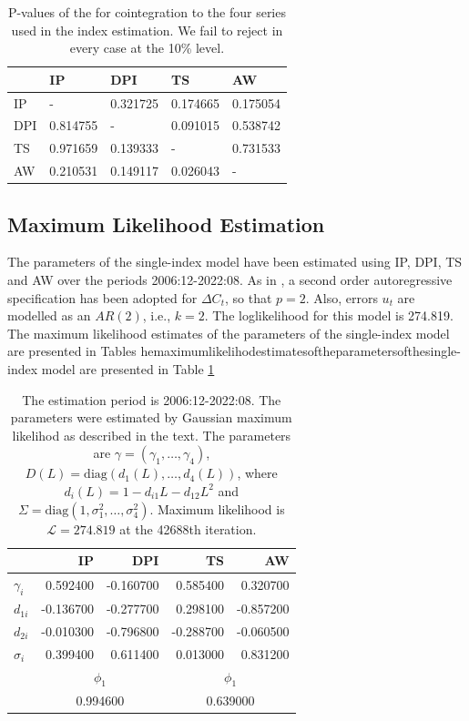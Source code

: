 	\begin{table}[h!]
		\centering\small
		\captionsetup{width=0.6\textwidth, font=small}
		\caption{P-values of the \protect\cite{engle1987co} for cointegration to the four series used in the index estimation. We fail to reject in every case at the 10\% level.}
		\begin{tabular}{l|llll}
		& IP & DPI & TS & AW \\\hline\hline
		IP & - & 0.321725 & 0.174665 & 0.175054 \\
		DPI & 0.814755 & - & 0.091015 & 0.538742 \\
		TS & 0.971659 & 0.139333 & - & 0.731533 \\
		AW & 0.210531 & 0.149117 & 0.026043 & - \\\hline
	\end{tabular}
	\end{table}

\subsection{Maximum Likelihood Estimation}

The parameters of the single-index model have been estimated using IP, DPI, TS and AW over the periods 2006:12-2022:08. As in , a second order autoregressive  specification  has been adopted for $\Delta C_t$, so that $p=2$. Also, errors $u_t$ are modelled as an $AR(2)$, i.e., $k=2$. The loglikelihood for this model is 274.819. The maximum likelihood estimates of the parameters of the single-index model are presented in Tables  hemaximumlikelihodestimatesoftheparametersofthesingle-index model are presented in Table \ref{tab:ml-params1}

	\begin{table}[h!]
		\centering\small
			\captionsetup{width=0.6\textwidth, font=small}
			\caption{The estimation period is 2006:12-2022:08. The parameters were estimated by Gaussian maximum likelihod as described in the text. The parameters are $\gamma = (\gamma_1,\ldots, \gamma_4)$, $D(L)=\text{diag}\left(d_1(L),\ldots, d_4(L)\right)$, where $d_i(L) = 1-d_{i1}L - d_{12}L^2$ and $\Sigma = \text{diag}\left(1,\sigma_1^2,\ldots,\sigma_4^2\right)$. Maximum likelihood is $\mathcal{L}=274.819$ at the 42688th iteration.}\label{tab:ml-params1}
		\begin{tabular}{l|rrrr}
			& IP & DPI & TS & AW \\\hline\hline
			$\gamma_i$ & 0.592400 & -0.160700 & 0.585400 & 0.320700 \\
			$d_{1i}$ & -0.136700 & -0.277700 & 0.298100 & -0.857200 \\
			$d_{2i}$ & -0.010300 & -0.796800 & -0.288700 & -0.060500 \\
			$\sigma_{i}$ & 0.399400 & 0.611400 & 0.013000 & 0.831200 \\\hline\hline
			&\multicolumn{2}{c}{$\phi_1$} & \multicolumn{2}{c}{$\phi_1$}  \\\hline\hline
			&\multicolumn{2}{c}{0.994600} & \multicolumn{2}{c}{0.639000} \\\hline
		\end{tabular}
	\end{table}

